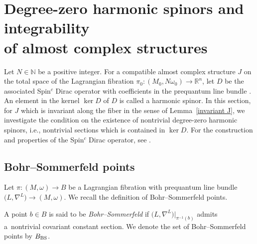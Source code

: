 \documentclass[10pt,a4paper]{amsart}
\numberwithin{equation}{section}
\newcommand{\R}{\mathbb{R}}
\newcommand{\N}{\mathbb{N}}
\begin{document}
\section[Degree-zero harmonic spinors and integrability of almost complex structures]{Degree-zero harmonic spinors and integrability\\ of almost complex structures}\label{equiv quantization}
Let $N\in \N$ be a positive integer. For a compatible almost complex structure $J$ on the total space of the Lagrangian fibration $\pi_0\colon (M_0,N\omega_0)\to \R^n$, let $D$ be the associated Spin${}^c$ Dirac operator with coefficients in the prequantum line bundle . An element in the kernel $\ker D$ of $D$ is called a harmonic spinor. In this section, for $J$ which is invariant along the fiber in the sense of Lemma~\ref{invariant J}, we investigate the condition on the existence of nontrivial degree-zero harmonic spinors, i.e., nontrivial sections which is contained in $\ker D$. For the construction and properties of the Spin${}^c$ Dirac operator, see \cite{MR1365745, LM}.


\subsection{Bohr--Sommerfeld points}
Let $\pi\colon (M,\omega)\to B$ be a Lagrangian fibration with prequantum line bundle $\bigl(L,\nabla^L\bigr)\to (M,\omega)$. We recall the definition of Bohr--Sommerfeld points.
\begin{Definition}
A point $b\in B$ is said to be \emph{Bohr--Sommerfeld} if $\bigl(L,\nabla^L\bigr)|_{\pi^{-1}(b)}$ admits a~nontrivial covariant constant section. We denote the set of Bohr--Sommerfeld points by $B_{\rm BS}$.
\end{Definition}
\end{document}
